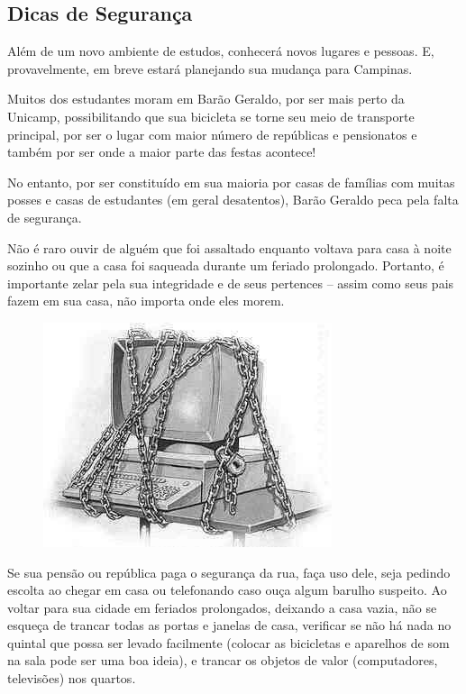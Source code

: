 \subsection{Dicas de Segurança}

Além de um novo ambiente de estudos, conhecerá novos lugares e pessoas. E,
provavelmente, em breve estará planejando sua mudança para Campinas.

Muitos dos estudantes moram em Barão Geraldo, por ser mais perto da Unicamp,
possibilitando que sua bicicleta se torne seu meio de transporte principal, por
ser o lugar com maior número de repúblicas e pensionatos e também por ser onde
a maior parte das festas acontece!

No entanto, por ser constituído em sua maioria por casas de famílias com muitas
posses e casas de estudantes (em geral desatentos), Barão Geraldo peca pela
falta de segurança.

Não é raro ouvir de alguém que foi assaltado enquanto voltava para casa à noite
sozinho ou que a casa foi saqueada durante um feriado prolongado. Portanto,
é importante zelar pela sua integridade e de seus pertences -- assim como seus
pais fazem em sua casa, não importa onde eles morem.
\begin{figure}[h!]
    \centering
    \includegraphics[scale=0.55,keepaspectratio=true]{img/imgs/5-moradia/seguranca.jpg}
\end{figure}

Se sua pensão ou república paga o segurança da rua, faça uso dele, seja pedindo
escolta ao chegar em casa ou telefonando caso ouça algum barulho suspeito. Ao
voltar para sua cidade em feriados prolongados, deixando a casa vazia, não se
esqueça de trancar todas as portas e janelas de casa, verificar se não há nada
no quintal que possa ser levado facilmente (colocar as bicicletas e aparelhos de
som na sala pode ser uma boa ideia), e trancar os objetos de valor
(computadores, televisões) nos quartos.

